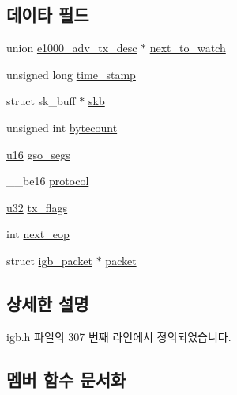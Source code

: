 \subsection*{데이타 필드}
\begin{DoxyCompactItemize}
\item 
union \hyperlink{unione1000__adv__tx__desc}{e1000\+\_\+adv\+\_\+tx\+\_\+desc} $\ast$ \hyperlink{structigb__tx__buffer_a98ad5fb04406aff9d2b4b6eea9db689f}{next\+\_\+to\+\_\+watch}
\item 
unsigned long \hyperlink{structigb__tx__buffer_a5d390b40ee7866a00e496883fb21fb15}{time\+\_\+stamp}
\item 
struct sk\+\_\+buff $\ast$ \hyperlink{structigb__tx__buffer_aeba6836824708325a83121030f092c30}{skb}
\item 
unsigned int \hyperlink{structigb__tx__buffer_a6e36fbc12221f170fbaa8134ae4e5e7c}{bytecount}
\item 
\hyperlink{lib_2igb_2e1000__osdep_8h_acdc9cf0314be0ae5a01d6d4379a95edd}{u16} \hyperlink{structigb__tx__buffer_a6c470eb193221275df0074f1af9faa47}{gso\+\_\+segs}
\item 
\+\_\+\+\_\+be16 \hyperlink{structigb__tx__buffer_ae6852c5fea84edd47e3d3ce930c41cf1}{protocol}
\item 
\hyperlink{lib_2igb_2e1000__osdep_8h_a64e91c10a0d8fb627e92932050284264}{u32} \hyperlink{structigb__tx__buffer_a428012b2ca384e2898d6389025a7b6db}{tx\+\_\+flags}
\item 
int \hyperlink{structigb__tx__buffer_af565101ee13ca100904a7ac5b7564a3d}{next\+\_\+eop}
\item 
struct \hyperlink{structigb__packet}{igb\+\_\+packet} $\ast$ \hyperlink{structigb__tx__buffer_ac6186670bb595d9f22c89b6dc2779d14}{packet}
\end{DoxyCompactItemize}


\subsection{상세한 설명}


igb.\+h 파일의 307 번째 라인에서 정의되었습니다.



\subsection{멤버 함수 문서화}
